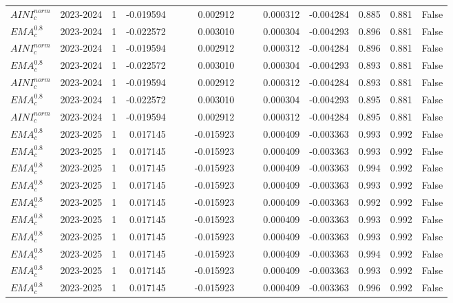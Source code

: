 \begin{tabular}{@{}llrrrrrrrrrlll@{}}
$AINI^{norm}_{c}$ & 2023-2024 & 1 & -0.019594 &  &  & 0.002912 &  &  & 0.000312 & -0.004284 & 0.885 & 0.881 & False \\
$EMA^{0.8}_{c}$ & 2023-2024 & 1 & -0.022572 &  &  & 0.003010 &  &  & 0.000304 & -0.004293 & 0.896 & 0.881 & False \\
$AINI^{norm}_{c}$ & 2023-2024 & 1 & -0.019594 &  &  & 0.002912 &  &  & 0.000312 & -0.004284 & 0.896 & 0.881 & False \\
$EMA^{0.8}_{c}$ & 2023-2024 & 1 & -0.022572 &  &  & 0.003010 &  &  & 0.000304 & -0.004293 & 0.893 & 0.881 & False \\
$AINI^{norm}_{c}$ & 2023-2024 & 1 & -0.019594 &  &  & 0.002912 &  &  & 0.000312 & -0.004284 & 0.893 & 0.881 & False \\
$EMA^{0.8}_{c}$ & 2023-2024 & 1 & -0.022572 &  &  & 0.003010 &  &  & 0.000304 & -0.004293 & 0.895 & 0.881 & False \\
$AINI^{norm}_{c}$ & 2023-2024 & 1 & -0.019594 &  &  & 0.002912 &  &  & 0.000312 & -0.004284 & 0.895 & 0.881 & False \\
$EMA^{0.8}_{c}$ & 2023-2025 & 1 & 0.017145 &  &  & -0.015923 &  &  & 0.000409 & -0.003363 & 0.993 & 0.992 & False \\
$EMA^{0.8}_{c}$ & 2023-2025 & 1 & 0.017145 &  &  & -0.015923 &  &  & 0.000409 & -0.003363 & 0.993 & 0.992 & False \\
$EMA^{0.8}_{c}$ & 2023-2025 & 1 & 0.017145 &  &  & -0.015923 &  &  & 0.000409 & -0.003363 & 0.994 & 0.992 & False \\
$EMA^{0.8}_{c}$ & 2023-2025 & 1 & 0.017145 &  &  & -0.015923 &  &  & 0.000409 & -0.003363 & 0.993 & 0.992 & False \\
$EMA^{0.8}_{c}$ & 2023-2025 & 1 & 0.017145 &  &  & -0.015923 &  &  & 0.000409 & -0.003363 & 0.992 & 0.992 & False \\
$EMA^{0.8}_{c}$ & 2023-2025 & 1 & 0.017145 &  &  & -0.015923 &  &  & 0.000409 & -0.003363 & 0.993 & 0.992 & False \\
$EMA^{0.8}_{c}$ & 2023-2025 & 1 & 0.017145 &  &  & -0.015923 &  &  & 0.000409 & -0.003363 & 0.993 & 0.992 & False \\
$EMA^{0.8}_{c}$ & 2023-2025 & 1 & 0.017145 &  &  & -0.015923 &  &  & 0.000409 & -0.003363 & 0.994 & 0.992 & False \\
$EMA^{0.8}_{c}$ & 2023-2025 & 1 & 0.017145 &  &  & -0.015923 &  &  & 0.000409 & -0.003363 & 0.993 & 0.992 & False \\
$EMA^{0.8}_{c}$ & 2023-2025 & 1 & 0.017145 &  &  & -0.015923 &  &  & 0.000409 & -0.003363 & 0.996 & 0.992 & False \\

\end{tabular}
